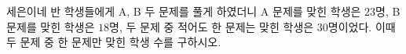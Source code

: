 세은이네 반 학생들에게 A, B 두 문제를 풀게 하였더니 A 문제를 맞힌 학생은 $23$명, B 문제를 맞힌 학생은 $18$명, 두 문제 중 적어도 한 문제는 맞힌 학생은 $30$명이었다. 이때 두 문제 중 한 문제만 맞힌 학생 수를 구하시오.
